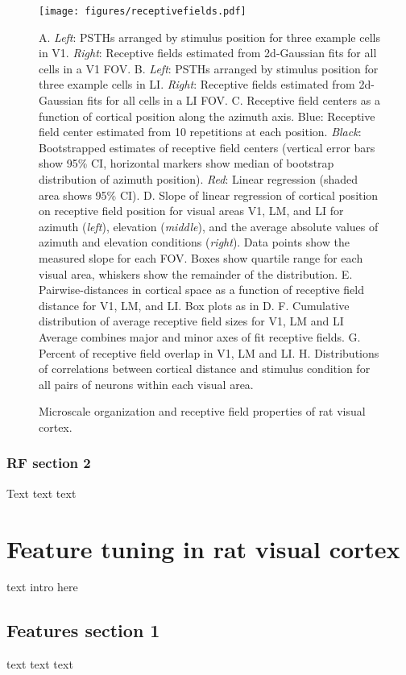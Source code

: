 \documentclass{article}
\begin{document}
\begin{figure}[ht]
  \texttt{[image: figures/receptivefields.pdf]}
  \caption{Microscale organization and receptive field properties of rat visual cortex.}
  \medskip
  \small
  A.  \textit{Left}:  PSTHs arranged by stimulus position for three example cells in V1. \textit{Right}:  Receptive fields estimated from 2d-Gaussian fits for all cells in a V1 FOV.
  B.  \textit{Left}:  PSTHs arranged by stimulus position for three example cells in LI. \textit{Right}:  Receptive fields estimated from 2d-Gaussian fits for all cells in a LI FOV.
  C.  Receptive field centers as a function of cortical position along the azimuth axis. Blue: Receptive field center estimated from 10 repetitions at each position. \textit{Black}: Bootstrapped estimates of receptive field centers (vertical error bars show 95\% CI, horizontal markers show median of bootstrap distribution of azimuth position). \textit{Red}: Linear regression (shaded area shows 95\% CI).
  D.  Slope of linear regression of cortical position on receptive field position for visual areas V1, LM, and LI for azimuth (\textit{left}), elevation (\textit{middle}), and the average absolute values of azimuth and elevation conditions (\textit{right}). Data points show the measured slope for each FOV.  Boxes show quartile range for each visual area, whiskers show the remainder of the distribution.
  E.  Pairwise-distances in cortical space as a function of receptive field distance for V1, LM, and LI. Box plots as in D. 
  F.  Cumulative distribution of average receptive field sizes for V1, LM and LI  Average combines major and minor axes of fit receptive fields. 
  G.  Percent of receptive field overlap in V1, LM and LI.  
  H.  Distributions of correlations between cortical distance and stimulus condition for all pairs of neurons within each visual area. 

  \label{fig:fig2}
\end{figure}

\subsubsection{RF section 2}
Text text text

\section{Feature tuning in rat visual cortex}
text intro here

\subsection{Features section 1}
text text text
\end{document}
